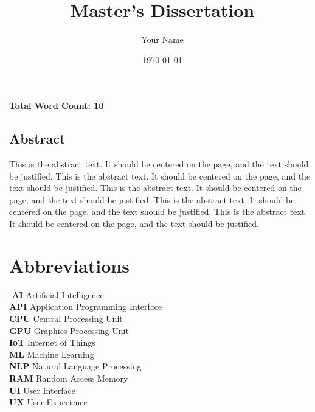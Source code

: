 \documentclass{article}%
\title{Master's Dissertation}%
\author{Your Name}%
\date{\today}%
\begin{document}
%
\normalsize%
\maketitle%

\vfill
\begin{center}\textbf{Total Word Count: 10}\end{center}
\newpage%
\vspace*{\fill}%
\begin{center}%
\begin{minipage}{0.8\textwidth}%
\begin{center}%
\section*{Abstract}%
\end{center}%
\justify%
This is the abstract text. It should be centered on the page, and the text should be justified. This is the abstract text. It should be centered on the page, and the text should be justified. This is the abstract text. It should be centered on the page, and the text should be justified. This is the abstract text. It should be centered on the page, and the text should be justified. This is the abstract text. It should be centered on the page, and the text should be justified. %
\end{minipage}%
\end{center}%
\vspace*{\fill}%
\newpage%
\tableofcontents%
\newpage%
\section*{Abbreviations}%
\label{sec:Abbreviations}%
\begin{tabbing}%
\hspace{3cm} \= \kill%
\textbf{AI} \> Artificial Intelligence \\%
\textbf{API} \> Application Programming Interface \\%
\textbf{CPU} \> Central Processing Unit \\%
\textbf{GPU} \> Graphics Processing Unit \\%
\textbf{IoT} \> Internet of Things \\%
\textbf{ML} \> Machine Learning \\%
\textbf{NLP} \> Natural Language Processing \\%
\textbf{RAM} \> Random Access Memory \\%
\textbf{UI} \> User Interface \\%
\textbf{UX} \> User Experience \\%
\end{tabbing}
\end{document}
